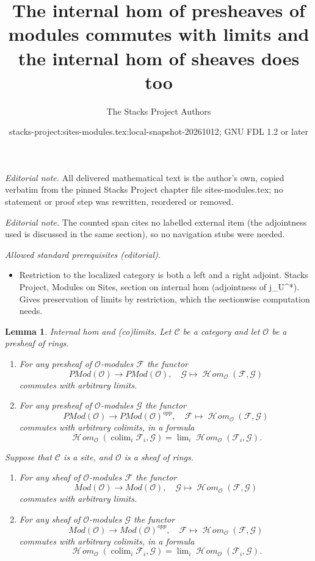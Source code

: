 \documentclass[10pt,a4paper]{amsart}
\title{The internal hom of presheaves of modules commutes with limits and the internal hom of sheaves does too}
\author{The Stacks Project Authors}
\date{stacks-project:sites-modules.tex:local-snapshot-20261012; GNU FDL 1.2 or later}
\theoremstyle{plain}
\newtheorem{lemma}[subsection]{Lemma}
\theoremstyle{definition}
\theoremstyle{remark}
\numberwithin{equation}{subsection}
\def\lim{\mathop{\mathrm{lim}}\nolimits}
\def\colim{\mathop{\mathrm{colim}}\nolimits}
\def\SheafHom{\mathop{\mathcal{H}\!\mathit{om}}\nolimits}
\begin{document}
\maketitle
\noindent\textit{Editorial note.} All delivered mathematical text is the author's own, copied verbatim from the pinned Stacks Project chapter file sites-modules.tex; no statement or proof step was rewritten, reordered or removed.\par\medskip
\noindent\textit{Editorial note.} The counted span cites no labelled external item (the adjointness used is discussed in the same section), so no navigation stubs were needed.\par\medskip
\noindent\textit{Allowed standard prerequisites (editorial).}\begin{itemize}
\item Restriction to the localized category is both a left and a right adjoint. Stacks Project, Modules on Sites, section on internal hom (adjointness of j\_U\textasciicircum{}*). Gives preservation of limits by restriction, which the sectionwise computation needs.
\end{itemize}\medskip
\begin{lemma}
\label{lemma-internal-hom-commute-limits}
Internal hom and (co)limits.
Let $\mathcal{C}$ be a category and let $\mathcal{O}$ be a presheaf of rings.
\begin{enumerate}
\item For any presheaf of $\mathcal{O}$-modules $\mathcal{F}$ the functor
$$
\textit{PMod}(\mathcal{O}) \longrightarrow \textit{PMod}(\mathcal{O})
, \quad
\mathcal{G} \longmapsto \SheafHom_\mathcal{O}(\mathcal{F}, \mathcal{G})
$$
commutes with arbitrary limits.
\item For any presheaf of $\mathcal{O}$-modules $\mathcal{G}$ the functor
$$
\textit{PMod}(\mathcal{O}) \longrightarrow \textit{PMod}(\mathcal{O})^{opp}
, \quad
\mathcal{F} \longmapsto \SheafHom_\mathcal{O}(\mathcal{F}, \mathcal{G})
$$
commutes with arbitrary colimits, in a formula
$$
\SheafHom_\mathcal{O}(\colim_i \mathcal{F}_i, \mathcal{G})
=
\lim_i \SheafHom_\mathcal{O}(\mathcal{F}_i, \mathcal{G}).
$$
\end{enumerate}
Suppose that $\mathcal{C}$ is a site, and $\mathcal{O}$ is a sheaf of rings.
\begin{enumerate}
\item[(3)] For any sheaf of $\mathcal{O}$-modules $\mathcal{F}$ the functor
$$
\textit{Mod}(\mathcal{O}) \longrightarrow \textit{Mod}(\mathcal{O})
, \quad
\mathcal{G} \longmapsto \SheafHom_\mathcal{O}(\mathcal{F}, \mathcal{G})
$$
commutes with arbitrary limits.
\item[(4)] For any sheaf of $\mathcal{O}$-modules $\mathcal{G}$ the functor
$$
\textit{Mod}(\mathcal{O}) \longrightarrow \textit{Mod}(\mathcal{O})^{opp}
, \quad
\mathcal{F} \longmapsto \SheafHom_\mathcal{O}(\mathcal{F}, \mathcal{G})
$$
commutes with arbitrary colimits, in a formula
$$
\SheafHom_\mathcal{O}(\colim_i \mathcal{F}_i, \mathcal{G})
=
\lim_i \SheafHom_\mathcal{O}(\mathcal{F}_i, \mathcal{G}).
$$
\end{enumerate}
\end{lemma}
\end{document}
